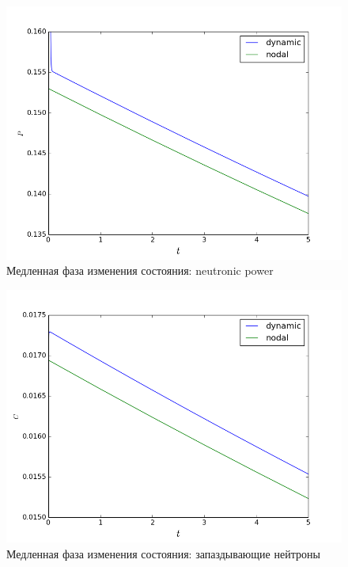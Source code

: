 \documentclass[authoryear]{elsarticle}
\begin{document}
\begin{figure}[!h]
  \begin{center}
    \includegraphics[width=0.9\linewidth] {15.png}
	\caption{Медленная фаза изменения состояния: neutronic power}
	\label{fig:15}
  \end{center}
\end{figure} 

\begin{figure}[!h]
  \begin{center}
    \includegraphics[width=0.9\linewidth] {16.png}
	\caption{Медленная фаза изменения состояния: запаздывающие нейтроны}
	\label{fig:16}
  \end{center}
\end{figure} 
\end{document}
